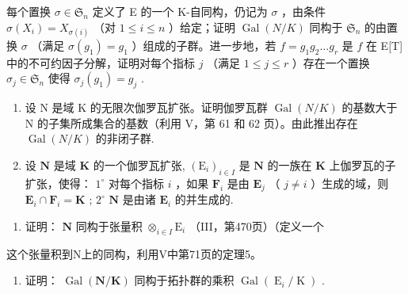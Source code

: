 每个置换 \(\sigma \in \mathfrak{S}_n\) 定义了 E 的一个 K-自同构，仍记为 \(\sigma\) ，由条件 \(\sigma(X_i) = X_{\sigma(i)}\) （对 \(1 \leqslant i \leqslant n\) ）给定；证明 \(\operatorname{Gal}(N/K)\) 同构于 \(\mathfrak{S}_n\) 的由置换 \(\sigma\) （满足 \(\sigma(g_1) = g_1\) ）组成的子群。进一步地，若 \(f = g_1g_2 \ldots g_r\) 是 \(f\) 在 E{[}T{]} 中的不可约因子分解，证明对每个指标 \(j\) （满足 \(1 \leqslant j \leqslant r\) ）存在一个置换 \(\sigma_j \in \mathfrak{S}_n\) 使得 \(\sigma_j(g_1) = g_j\) .

\begin{enumerate}
\def\labelenumi{\arabic{enumi})}
\setcounter{enumi}{2}
\item
  设 N 是域 K 的无限次伽罗瓦扩张。证明伽罗瓦群 \(\operatorname{Gal}(N/K)\) 的基数大于 N 的子集所成集合的基数（利用 V，第 61 和 62 页）。由此推出存在 \(\operatorname{Gal}(N/K)\) 的非闭子群.
\item
  设 \(\mathbf{N}\) 是域 \(\mathbf{K}\) 的一个伽罗瓦扩张, \((\mathrm{E}_i)_{i\in I}\) 是 \(\mathbf{N}\) 的一族在 \(\mathbf{K}\) 上伽罗瓦的子扩张，使得： \(1^{\circ}\) 对每个指标 \(i\) ，如果 \(\mathbf{F}_i\) 是由 \(\mathbf{E}_j\) （ \(j\neq i\) ）生成的域，则 \(\mathbf{E}_i\cap \mathbf{F}_i = \mathbf{K}\) ; \(2^{\circ}\) \(\mathbf{N}\) 是由诸 \(\mathbf{E}_i\) 的并生成的.
\end{enumerate}

\begin{enumerate}
\def\labelenumi{\alph{enumi})}
\tightlist
\item
  证明： \(\mathbf{N}\) 同构于张量积 \(\otimes_{i\in I}\mathrm{E}_i\) （III，第470页）（定义一个
\end{enumerate}

这个张量积到N上的同构，利用V中第71页的定理5。

\begin{enumerate}
\def\labelenumi{\alph{enumi})}
\setcounter{enumi}{1}
\tightlist
\item
  证明： \(\operatorname{Gal}(\mathbf{N}/\mathbf{K})\) 同构于拓扑群的乘积 \(\operatorname{Gal}(\operatorname{E}_{i}/\operatorname{K})\) .
\end{enumerate}

